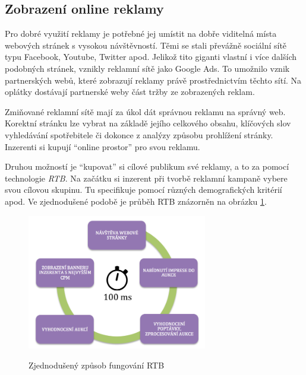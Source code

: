     \subsection{Zobrazení online reklamy}
    Pro dobré využití reklamy je potřebné jej umístit na dobře viditelná místa webových stránek s vysokou návštěvností.
    Těmi se stali převážně sociální sítě typu Facebook, Youtube, Twitter apod. Jelikož tito giganti vlastní i více dalších podobných stránek,
    vznikly reklamní sítě jako Google Ads. To umožnilo vznik partnerských webů, které zobrazují reklamy právě prostřednictvím těchto sítí.
    Na oplátky dostávají partnerské weby část tržby ze zobrazených reklam.

    Zmiňované reklamní sítě mají za úkol dát správnou reklamu na správný web.
    Korektní stránku lze vybrat na základě jejího celkového obsahu, klíčových slov vyhledávání spotřebitele či dokonce z analýzy způsobu prohlížení stránky.
    Inzerenti si kupují \enquote{online prostor} pro svou reklamu. 

    Druhou možností je \enquote{kupovat} si cílové publikum své reklamy, a to za pomocí technologie \emph{RTB}.
    Na začátku si inzerent při tvorbě reklamní kampaně vybere svou cílovou skupinu. Tu specifikuje pomocí různých demografických kritérií apod.
    Ve zjednodušené podobě je průběh RTB znázorněn na obrázku \ref{fig:rtb}.

    \begin{figure}[h]
        \centering
        \caption[Fungování RTB]{Zjednodušený způsob fungování RTB}
        \includegraphics[width=0.7\textwidth]{Figures/rtb.png}
        \label{fig:rtb}
    \end{figure}

\endinput